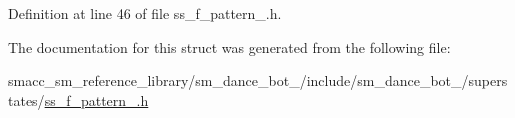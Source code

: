 Definition at line 46 of file ss\+\_\+f\+\_\+pattern\+\_.\+h.



The documentation for this struct was generated from the following file\+:\begin{DoxyCompactItemize}
\item 
smacc\+\_\+sm\+\_\+reference\+\_\+library/sm\+\_\+dance\+\_\+bot\+\_/include/sm\+\_\+dance\+\_\+bot\+\_/superstates/\hyperlink{3_2include_2sm__dance__bot__3_2superstates_2ss__f__pattern__1_8h}{ss\+\_\+f\+\_\+pattern\+\_.\+h}\end{DoxyCompactItemize}

